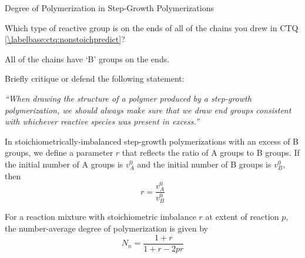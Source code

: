 \begin{activity}{Degree of Polymerization in Step-Growth Polymerizations}
\begin{ctqs}
		\question Which type of reactive group is on the ends of all of the chains you drew in CTQ \ref{\labelbase:ctq:nonstoichpredict}?
		
		\begin{solution}[0.5in]
			All of the chains have `B' groups on the ends.
		\end{solution}
		
		\question Briefly critique or defend the following statement:
		
			\emph{``When drawing the structure of a polymer produced by a step-growth polymerization, we should always make sure that we draw end groups consistent with whichever reactive species was present in excess.''}
		
		\begin{solution}[1.85in]
		\end{solution}
			
\end{ctqs}
	
\begin{infobox}

In stoichiometrically-imbalanced step-growth polymerizations with an excess of B groups, we define a parameter $r$ that reflects the ratio of A groups to B groups.	
	If the initial number of A groups is $v_A^0$ and the initial number of B groups is $v_B^0$, then
	\begin{equation*}
		r = \frac{v_A^0}{v_B^0}
	\end{equation*}
	
	
	For a reaction mixture with stoichiometric imbalance $r$ at extent of reaction $p$, the number-average degree of polymerization is given by
	\begin{equation*}
		N_n = \frac{1+r}{1+r-2pr}
	\end{equation*}
	

\end{infobox}
\end{activity}
